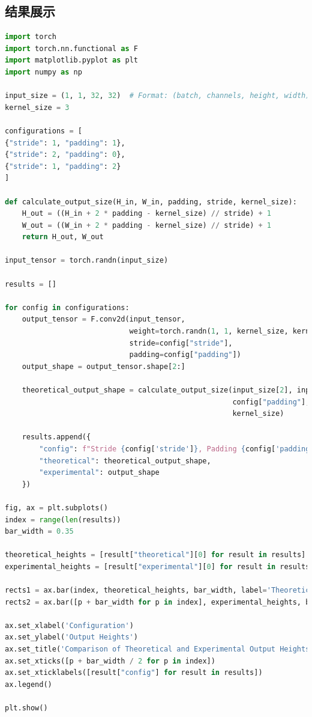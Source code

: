 \documentclass[a4paper,12pt]{article}
\begin{document}
\subsection{结果展示}
\begin{lstlisting}[language=Python]
import torch
import torch.nn.functional as F
import matplotlib.pyplot as plt
import numpy as np

input_size = (1, 1, 32, 32)  # Format: (batch, channels, height, width)
kernel_size = 3

configurations = [
{"stride": 1, "padding": 1},
{"stride": 2, "padding": 0},
{"stride": 1, "padding": 2}
]

def calculate_output_size(H_in, W_in, padding, stride, kernel_size):
	H_out = ((H_in + 2 * padding - kernel_size) // stride) + 1
	W_out = ((W_in + 2 * padding - kernel_size) // stride) + 1
	return H_out, W_out

input_tensor = torch.randn(input_size)

results = []

for config in configurations:
	output_tensor = F.conv2d(input_tensor, 
							 weight=torch.randn(1, 1, kernel_size, kernel_size),
							 stride=config["stride"],
							 padding=config["padding"])
	output_shape = output_tensor.shape[2:]

	theoretical_output_shape = calculate_output_size(input_size[2], input_size[3], 
													 config["padding"], config["stride"], 
													 kernel_size)

	results.append({
		"config": f"Stride {config['stride']}, Padding {config['padding']}",
		"theoretical": theoretical_output_shape,
		"experimental": output_shape
	})

fig, ax = plt.subplots()
index = range(len(results))
bar_width = 0.35

theoretical_heights = [result["theoretical"][0] for result in results]
experimental_heights = [result["experimental"][0] for result in results]

rects1 = ax.bar(index, theoretical_heights, bar_width, label='Theoretical')
rects2 = ax.bar([p + bar_width for p in index], experimental_heights, bar_width, label='Experimental')

ax.set_xlabel('Configuration')
ax.set_ylabel('Output Heights')
ax.set_title('Comparison of Theoretical and Experimental Output Heights')
ax.set_xticks([p + bar_width / 2 for p in index])
ax.set_xticklabels([result["config"] for result in results])
ax.legend()

plt.show()


\end{lstlisting}
\end{document}
